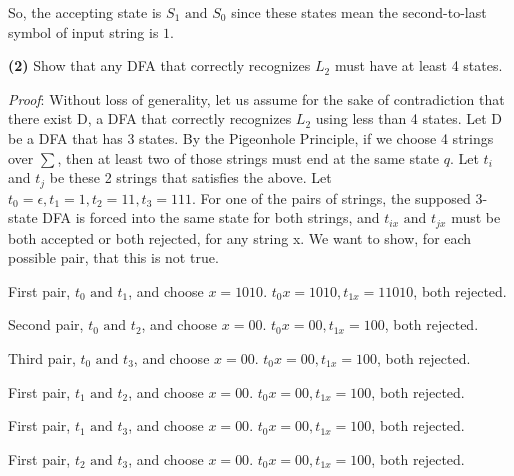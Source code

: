 \documentclass[a4paper, 11pt]{article}
\renewcommand{\part}[1] {\vspace{.10in} {\bf (#1)}}
\begin{document}
	So, the accepting state is $S_1 \text{ and } S_0$ since these states mean the second-to-last symbol of input string is $1$.
	
	
	\part{2} Show that any DFA that correctly recognizes $L_2$ must have at least 4 states.
	
	{\em Proof}: Without loss of generality, let us assume for the sake of contradiction that there exist D, a DFA that correctly recognizes $L_2$ using less than 4 states. Let D be a DFA that has 3 states. By the Pigeonhole Principle, if we choose 4 strings over $\sum$, then at least two of those strings must end at the same state $q$. Let $t_i$ and $t_j$ be these 2 strings that satisfies the above. Let $t_0 = \epsilon, t_1 = 1, t_2 = 11, t_3 = 111$. For one of the pairs of strings, the supposed 3-state DFA is forced into the same state for both strings, and $t_{ix} \text{ and } t_{jx}$ must be both accepted or both rejected, for
	any string x. We want to show, for each possible pair, that this is not true. 
	
	First pair, $t_0 \text{ and } t_1$, and choose $x = 1010$. $t_0x = 1010, t_{1x} = 11010$, both rejected.
	
	Second pair, $t_0 \text{ and } t_2$, and choose $x = 00$. $t_0x = 00, t_{1x} = 100$, both rejected.
	
	Third pair, $t_0 \text{ and } t_3$, and choose $x = 00$. $t_0x = 00, t_{1x} = 100$, both rejected.
	
	First pair, $t_1 \text{ and } t_2$, and choose $x = 00$. $t_0x = 00, t_{1x} = 100$, both rejected.
	
	First pair, $t_1 \text{ and } t_3$, and choose $x = 00$. $t_0x = 00, t_{1x} = 100$, both rejected.
	
	First pair, $t_2 \text{ and } t_3$, and choose $x = 00$. $t_0x = 00, t_{1x} = 100$, both rejected.
	
	
\end{document}
